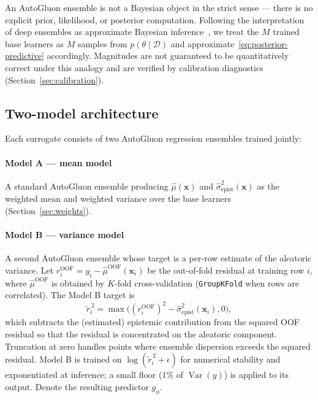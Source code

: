\documentclass[conference]{IEEEtran}
\DeclareMathOperator{\Var}{Var}
\begin{document}
An AutoGluon ensemble is not a Bayesian object in the strict sense --- there is no explicit prior, likelihood, or posterior computation. Following the interpretation of deep ensembles as approximate Bayesian inference~\cite{lakshminarayanan2017,wilson2020}, we treat the $M$ trained base learners as $M$ samples from $p(\theta \mid \mathcal{D})$ and approximate~\eqref{eq:posterior-predictive} accordingly. Magnitudes are not guaranteed to be quantitatively correct under this analogy and are verified by calibration diagnostics (Section~\ref{sec:calibration}).

\subsection{Two-model architecture}

Each surrogate consists of two AutoGluon regression ensembles trained jointly:

\paragraph{Model A --- mean model} A standard AutoGluon ensemble producing $\hat\mu(\bm x)$ and $\hat\sigma^2_{\text{epist}}(\bm x)$ as the weighted mean and weighted variance over the base learners (Section~\ref{sec:weights}).

\paragraph{Model B --- variance model} A second AutoGluon ensemble whose target is a per-row estimate of the aleatoric variance. Let $r_i^{\text{OOF}} = y_i - \hat\mu^{\text{OOF}}(\bm x_i)$ be the out-of-fold residual at training row $i$, where $\hat\mu^{\text{OOF}}$ is obtained by $K$-fold cross-validation (\texttt{GroupKFold} when rows are correlated). The Model B target is
\begin{equation}
\tilde r_i^{\,2} = \max\!\big( (r_i^{\text{OOF}})^2 - \hat\sigma^2_{\text{epist}}(\bm x_i), 0 \big),
\label{eq:residual-correction}
\end{equation}
which subtracts the (estimated) epistemic contribution from the squared OOF residual so that the residual is concentrated on the aleatoric component. Truncation at zero handles points where ensemble dispersion exceeds the squared residual. Model B is trained on $\log(\tilde r_i^{\,2} + \epsilon)$ for numerical stability and exponentiated at inference; a small floor (1\% of $\Var(y)$) is applied to its output. Denote the resulting predictor $g_\phi$.
\end{document}
